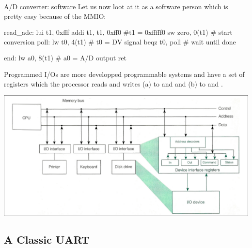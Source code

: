 \begin{parag}{A/D converter: software}
    Let us now loot at it as a software person which is pretty easy because of the MMIO:
	\begin{lstlistings}[language={[RISC-V]Assembler}]
read\_adc: 
	lui t1, 0xfff 
	addi t1, t1, 0xff0 #t1 = 0xfffff0
	sw zero, 0(t1) # start conversion 
poll:
	lw t0, 4(t1) # t0 = DV signal 
	beqz t0, poll  # wait until done

end:
	lw a0, 8(t1) # a0 = A/D output 
	ret
	\end{lstlistings}
\end{parag}




\begin{parag}{Programmed I/Os}
     are more developped programmable systems and have a set of registers which the processor reads and writes (a) to  and  and (b) to  and .
	\begin{center}
	\includegraphics[scale=0.2]{screenshots/2025-10-22_10.png}
	\end{center}
\end{parag}

\subsection{A Classic UART}

